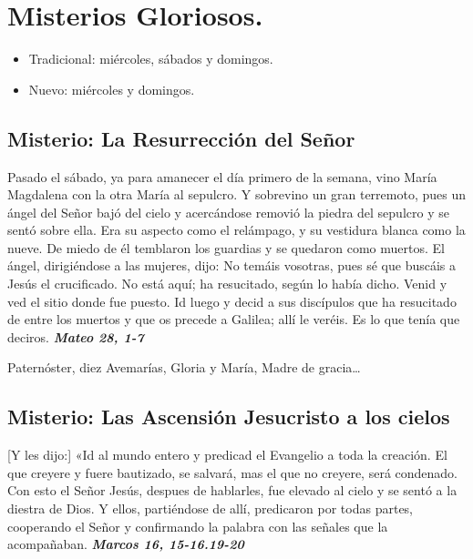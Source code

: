 \documentclass[./rosary.tex]{subfiles}
\newcounter{glorious-counter}
\begin{document}
\section*{Misterios Gloriosos.}
\begin{itemize}
      \item Tradicional: miércoles, sábados y domingos.
      \item Nuevo: miércoles y domingos.
\end{itemize}

\subsection*{ Misterio: La Resurrección del Señor}

Pasado el sábado, ya para amanecer el día primero de la semana, vino María Magdalena con la otra María al sepulcro. Y sobrevino un gran terremoto, 
pues un ángel del Señor bajó del cielo y acercándose removió la piedra del sepulcro y se sentó sobre ella. Era su aspecto como el relámpago, 
y su vestidura blanca como la nueve. De miedo de él temblaron los guardias y se quedaron como muertos. El ángel, dirigiéndose a las mujeres, dijo:
No temáis vosotras, pues sé que buscáis a Jesús el crucificado. No está aquí; ha resucitado, según lo había dicho. Venid y ved el sitio donde fue puesto.
Id luego y decid a sus discípulos que ha resucitado de entre los muertos y que os precede a Galilea; allí le veréis. Es lo que tenía que deciros. 
\textbf{\emph{Mateo 28, 1-7}}

\begin{center}
      Paternóster, diez Avemarías, Gloria y María, Madre de gracia{\ldots}
\end{center}


\bigskip

\subsection*{ Misterio: Las Ascensión Jesucristo a los cielos}

[Y les dijo:] «Id al mundo entero y predicad el Evangelio a toda la creación. El que creyere y fuere bautizado, se salvará, mas el que no creyere, será condenado. 
Con esto el Señor Jesús, despues de hablarles, fue elevado al cielo y se sentó a la diestra de Dios. Y ellos, partiéndose de allí, predicaron por todas partes, 
cooperando el Señor y confirmando la palabra con las señales que la acompañaban. 
\textbf{\emph{Marcos 16, 15-16.19-20}}
\end{document}
